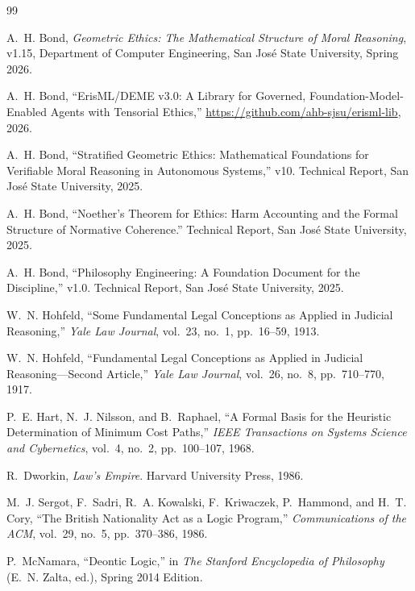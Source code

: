 \documentclass[12pt]{article}
\theoremstyle{definition}
\theoremstyle{remark}
\begin{document}
\begin{thebibliography}{99}

A.~H. Bond, \emph{Geometric Ethics: The Mathematical Structure of Moral Reasoning}, v1.15, Department of Computer Engineering, San Jos\'{e} State University, Spring 2026.

A.~H. Bond, ``ErisML/DEME v3.0: A Library for Governed, Foundation-Model-Enabled Agents with Tensorial Ethics,'' \url{https://github.com/ahb-sjsu/erisml-lib}, 2026.

A.~H. Bond, ``Stratified Geometric Ethics: Mathematical Foundations for Verifiable Moral Reasoning in Autonomous Systems,'' v10. Technical Report, San Jos\'{e} State University, 2025.

A.~H. Bond, ``Noether's Theorem for Ethics: Harm Accounting and the Formal Structure of Normative Coherence.'' Technical Report, San Jos\'{e} State University, 2025.

A.~H. Bond, ``Philosophy Engineering: A Foundation Document for the Discipline,'' v1.0. Technical Report, San Jos\'{e} State University, 2025.

W.~N. Hohfeld, ``Some Fundamental Legal Conceptions as Applied in Judicial Reasoning,'' \emph{Yale Law Journal}, vol.~23, no.~1, pp.~16--59, 1913.

W.~N. Hohfeld, ``Fundamental Legal Conceptions as Applied in Judicial Reasoning---Second Article,'' \emph{Yale Law Journal}, vol.~26, no.~8, pp.~710--770, 1917.

P.~E. Hart, N.~J. Nilsson, and B.~Raphael, ``A Formal Basis for the Heuristic Determination of Minimum Cost Paths,'' \emph{IEEE Transactions on Systems Science and Cybernetics}, vol.~4, no.~2, pp.~100--107, 1968.

R.~Dworkin, \emph{Law's Empire}. Harvard University Press, 1986.

M.~J. Sergot, F.~Sadri, R.~A. Kowalski, F.~Kriwaczek, P.~Hammond, and H.~T. Cory, ``The British Nationality Act as a Logic Program,'' \emph{Communications of the ACM}, vol.~29, no.~5, pp.~370--386, 1986.

P.~McNamara, ``Deontic Logic,'' in \emph{The Stanford Encyclopedia of Philosophy} (E.~N. Zalta, ed.), Spring 2014 Edition.


\end{thebibliography}
\end{document}
